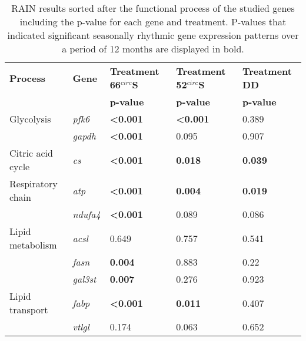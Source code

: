 \begin{table}[]
\caption{RAIN results  sorted after the functional process of the studied genes
including the p-value for each gene and treatment. P-values that indicated
significant seasonally rhythmic gene expression patterns over a period of 12
months are displayed in bold.}
\label{pub3_tab3}
\begin{tabular}{@{}lllll@{}}
\toprule
\textbf{Process}                       & \textbf{Gene}   & \textbf{Treatment 66$^{circ}$S}  & \textbf{Treatment 52$^{circ}$S}  & \textbf{Treatment DD} \\
                                       &                 & \textbf{p-value}         & \textbf{p-value}         & \textbf{p-value}      \\ \midrule
Glycolysis                             & \textit{pfk6}   & \textbf{\textless 0.001} & \textbf{\textless 0.001} & 0.389                 \\
                                       & \textit{gapdh}  & \textbf{\textless 0.001} & 0.095                    & 0.907                 \\
Citric acid cycle                      & \textit{cs}     & \textbf{\textless 0.001} & \textbf{0.018}           & \textbf{0.039}        \\
Respiratory chain                      & \textit{atp}    & \textbf{\textless 0.001} & \textbf{0.004}           & \textbf{0.019}        \\
                                       & \textit{ndufa4} & \textbf{\textless 0.001} & 0.089                    & 0.086                 \\
Lipid metabolism                       & \textit{acsl}   & 0.649                    & 0.757                    & 0.541                 \\
                                       & \textit{fasn}   & \textbf{0.004}           & 0.883                    & 0.22                  \\
                                       & \textit{gal3st} & \textbf{0.007}           & 0.276                    & 0.923                 \\
Lipid transport                        & \textit{fabp}   & \textbf{\textless 0.001} & \textbf{0.011}           & 0.407                 \\
                                       & \textit{vtlgl}  & 0.174                    & 0.063                    & 0.652                 \\

\end{tabular}
\end{table}
